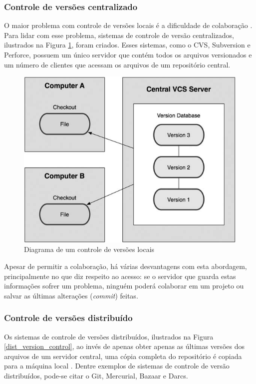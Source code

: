 \subsubsection{Controle de versões centralizado}

O maior problema com controle de versões locais é a dificuldade de colaboração \cite[p. 3]{progit}. Para lidar com esse problema, sistemas de controle de versão centralizados, ilustrados na Figura \ref{central_version_control}, foram criados. Esses sistemas, como o CVS, Subversion e Perforce, possuem um único servidor que contém todos os arquivos versionados e um número de clientes que acessam os arquivos de um repositório central.

\begin{figure} [ht]
	\centering
	\includegraphics[scale=0.4]{central_version_control.png}
	\caption{Diagrama de um controle de versões locais \cite[p. 2]{progit}}
	\label{central_version_control}
\end{figure}

Apesar de permitir a colaboração, há várias desvantagens com esta abordagem, principalmente no que diz respeito ao acesso: se o servidor que guarda estas informações sofrer um problema, ninguém poderá colaborar em um projeto ou salvar as últimas alterações (\emph{commit}) feitas.

\subsubsection{Controle de versões distribuído}

Os sistemas de controle de versões distribuídos, ilustrados na Figura \ref{dist_version_control}, ao invés de apenas obter apenas as últimas versões dos arquivos de um servidor central, uma cópia completa do repositório é copiada para a máquina local \cite[p. 4]{progit}. Dentre exemplos de sistemas de controle de versão distribuídos, pode-se citar o Git, Mercurial, Bazaar e Darcs.

